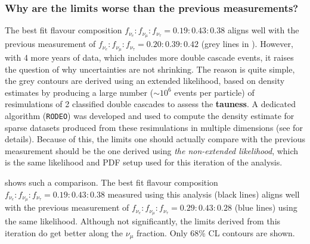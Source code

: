 \subsubsection{Why are the limits worse than the previous measurements?}
The best fit flavour composition $f_{\nu_e}:f_{\nu_{\mu}}:f_{\nu_{\tau}} = 0.19:0.43:0.38$ aligns well with the previous measurement  of $f_{\nu_e}:f_{\nu_{\mu}}:f_{\nu_{\tau}} = 0.20:0.39:0.42$ (grey lines in ). However, with 4 more years of data, which includes more double cascade events, it raises the question of why uncertainties are not shrinking. The reason is quite simple, the grey contours are derived using an extended likelihood, based on density estimates by producing a large number ($\sim10^6$ events per particle) of resimulations of 2 classified double cascades to assess the \textbf{tauness}. A dedicated algorithm (\texttt{RODEO}) was developed and used to compute the density estimate for sparse datasets produced from these resimulations in multiple dimensions (see  for details). Because of this, the limits one should actually compare with the previous measurement should be the one derived using \emph{the non-extended likelihood}, which is the same likelihood and PDF setup used for this iteration of the analysis.


 shows such a comparison. The best fit flavour composition $f_{\nu_e}:f_{\nu_{\mu}}:f_{\nu_{\tau}} = 0.19:0.43:0.38$ measured using this analysis (black lines) aligns well with the previous measurement of $f_{\nu_e}:f_{\nu_{\mu}}:f_{\nu_{\tau}} = 0.29:0.43:0.28$ (blue lines) using the same likelihood. Although not significantly, the limits derived from this iteration do get better along the $\nu_{\mu}$ fraction. Only 68\% CL contours  are shown.

